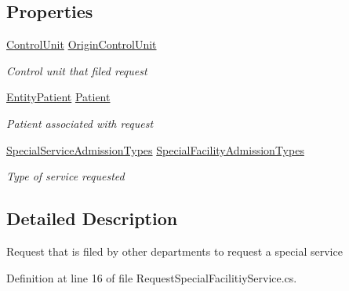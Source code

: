 \subsection*{Properties}
\begin{DoxyCompactItemize}
\item 
\hyperlink{class_simulation_core_1_1_h_c_c_m_elements_1_1_control_unit}{Control\+Unit} \hyperlink{class_general_health_care_elements_1_1_special_facility_1_1_request_special_facilitiy_service_ab603f52cec8f15ba0c4bffce586f366e}{Origin\+Control\+Unit}
\begin{DoxyCompactList}\small\item\em Control unit that filed request \end{DoxyCompactList}\item 
\hyperlink{class_general_health_care_elements_1_1_entities_1_1_entity_patient}{Entity\+Patient} \hyperlink{class_general_health_care_elements_1_1_special_facility_1_1_request_special_facilitiy_service_a854d5093433eb784a1c2a4ba0528b651}{Patient}
\begin{DoxyCompactList}\small\item\em Patient associated with request \end{DoxyCompactList}\item 
\hyperlink{class_general_health_care_elements_1_1_treatment_admission_types_1_1_special_service_admission_types}{Special\+Service\+Admission\+Types} \hyperlink{class_general_health_care_elements_1_1_special_facility_1_1_request_special_facilitiy_service_a82d8a831c8df8a6c1b0bf2b96c1008ce}{Special\+Facility\+Admission\+Types}
\begin{DoxyCompactList}\small\item\em Type of service requested \end{DoxyCompactList}\end{DoxyCompactItemize}


\subsection{Detailed Description}
Request that is filed by other departments to request a special service 



Definition at line 16 of file Request\+Special\+Facilitiy\+Service.\+cs.



